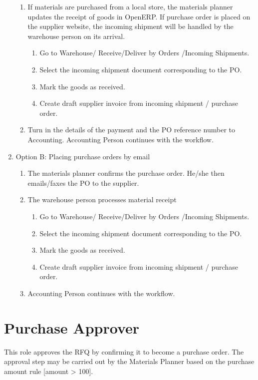 \begin{enumerate}
\begin{enumerate}
  \item If materials are purchased from a local store, the materials planner updates the receipt of goods in OpenERP. If purchase order is placed on the supplier website, the incoming shipment will be handled by the warehouse person on its arrival.
    \begin{enumerate}
    \item Go to Warehouse/ Receive/Deliver by Orders /Incoming Shipments.
    \item Select the incoming shipment document corresponding to the PO.
    \item Mark the goods as received.
    \item Create draft supplier invoice from incoming shipment / purchase order.
    \end{enumerate}
  \item Turn in the details of the payment and the PO reference number to Accounting.  Accounting Person continues with the workflow.
  \end{enumerate}
\item Option B: Placing purchase orders by email
  \begin{enumerate}
  \item The materials planner confirms the purchase order. He/she then emails/faxes the PO to the supplier. 
  \item The warehouse person processes material receipt
    \begin{enumerate}
    \item Go to Warehouse/ Receive/Deliver by Orders /Incoming Shipments.
    \item Select the incoming shipment document corresponding to the PO.
    \item Mark the goods as received.
    \item Create draft supplier invoice from incoming shipment / purchase order.
    \end{enumerate}
  \item Accounting Person continues with the workflow.
  \end{enumerate}
\end{enumerate}

\section{Purchase Approver}

This role approves the RFQ by confirming it to become a purchase order. The approval step may be carried out by the Materials Planner based on the purchase amount rule [amount > 100].


